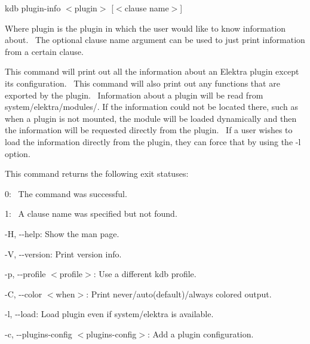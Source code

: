 {\ttfamily kdb plugin-\/info $<$plugin$>$ \mbox{[}$<$clause name$>$\mbox{]}}~\newline


Where {\ttfamily plugin} is the plugin in which the user would like to know information about.~\newline
 The optional {\ttfamily clause name} argument can be used to just print information from a certain clause.~\newline


This command will print out all the information about an Elektra plugin except it\textquotesingle{}s configuration.~\newline
 This command will also print out any functions that are exported by the plugin.~\newline
 Information about a plugin will be read from {\ttfamily system/elektra/modules/}. If the information could not be located there, such as when a plugin is not mounted, the module will be loaded dynamically and then the information will be requested directly from the plugin.~\newline
 If a user wishes to load the information directly from the plugin, they can force that by using the {\ttfamily -\/l} option.~\newline


This command returns the following exit statuses\+:~\newline



\begin{DoxyItemize}
\item 0\+:~\newline
 The command was successful.~\newline

\item 1\+:~\newline
 A {\ttfamily clause name} was specified but not found.~\newline

\end{DoxyItemize}


\begin{DoxyItemize}
\item {\ttfamily -\/H}, {\ttfamily -\/-\/help}\+: Show the man page.
\item {\ttfamily -\/V}, {\ttfamily -\/-\/version}\+: Print version info.
\item {\ttfamily -\/p}, {\ttfamily -\/-\/profile $<$profile$>$}\+: Use a different kdb profile.
\item {\ttfamily -\/C}, {\ttfamily -\/-\/color $<$when$>$}\+: Print never/auto(default)/always colored output.
\item {\ttfamily -\/l}, {\ttfamily -\/-\/load}\+: Load plugin even if system/elektra is available.
\item {\ttfamily -\/c}, {\ttfamily -\/-\/plugins-\/config $<$plugins-\/config$>$}\+: Add a plugin configuration.
\end{DoxyItemize}

